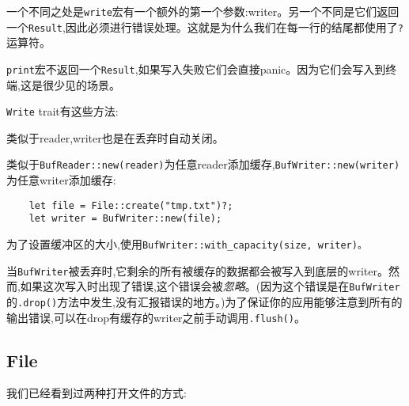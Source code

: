 一个不同之处是\texttt{write}宏有一个额外的第一个参数:writer。另一个不同是它们返回一个\texttt{Result},因此必须进行错误处理。这就是为什么我们在每一行的结尾都使用了\texttt{?}运算符。

\texttt{print}宏不返回一个\texttt{Result},如果写入失败它们会直接panic。因为它们会写入到终端,这是很少见的场景。

\texttt{Write} trait有这些方法:



类似于reader,writer也是在丢弃时自动关闭。

类似于\texttt{BufReader::new(reader)}为任意reader添加缓存,\texttt{BufWriter::new(writer)}为任意writer添加缓存:
\begin{verbatim}
    let file = File::create("tmp.txt")?;
    let writer = BufWriter::new(file);
\end{verbatim}

为了设置缓冲区的大小,使用\texttt{BufWriter::with\_capacity(size, writer)。}

当\texttt{BufWriter}被丢弃时,它剩余的所有被缓存的数据都会被写入到底层的writer。然而,如果这次写入时出现了错误,这个错误会被\emph{忽略}。(因为这个错误是在\texttt{BufWriter}的\texttt{.drop()}方法中发生,没有汇报错误的地方。)为了保证你的应用能够注意到所有的输出错误,可以在drop有缓存的writer之前手动调用\texttt{.flush()}。

\subsection{File}\label{file}
我们已经看到过两种打开文件的方式:


